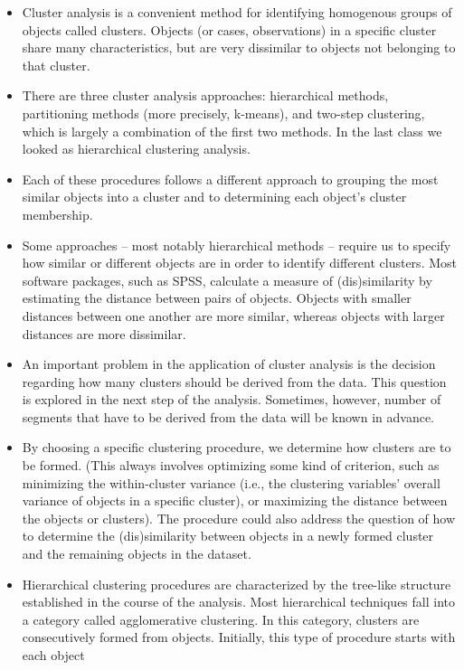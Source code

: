 \begin{itemize}
\item Cluster analysis is a convenient method for identifying homogenous groups of
objects called clusters. Objects (or cases, observations) in a specific cluster share
many characteristics, but are very dissimilar to objects not belonging to that cluster.
\item  There are three cluster analysis approaches: hierarchical methods,
partitioning methods (more precisely, k-means), and two-step clustering,
which is largely a combination of the first two methods. In the last class we looked as hierarchical clustering analysis.
\item Each of these procedures
follows a different approach to grouping the most similar objects into a cluster and
to determining each object’s cluster membership.
\item Some approaches – most notably hierarchical methods – require us to specify how similar or different objects
    are in order to identify different clusters. Most software packages, such as SPSS, calculate a measure
of (dis)similarity by estimating the distance between pairs of objects. Objects with
smaller distances between one another are more similar, whereas objects with larger
distances are more dissimilar.
\item An important problem in the application of cluster analysis is the decision
regarding how many clusters should be derived from the data. This question is
explored in the next step of the analysis. Sometimes, however,
number of segments that have to be derived from the data will be known in advance.
\item
By choosing a specific clustering procedure, we determine how clusters are to be
formed. (This always involves optimizing some kind of criterion, such as minimizing
the within-cluster variance (i.e., the clustering variables’ overall variance of
objects in a specific cluster), or maximizing the distance between the objects or
clusters). The procedure could also address the question of how to determine the
(dis)similarity between objects in a newly formed cluster and the remaining objects
in the dataset.
\item
Hierarchical clustering procedures are characterized by the tree-like structure
established in the course of the analysis. Most hierarchical techniques fall into a
category called agglomerative clustering. In this category, clusters are consecutively
formed from objects. Initially, this type of procedure starts with each object

\end{itemize}
